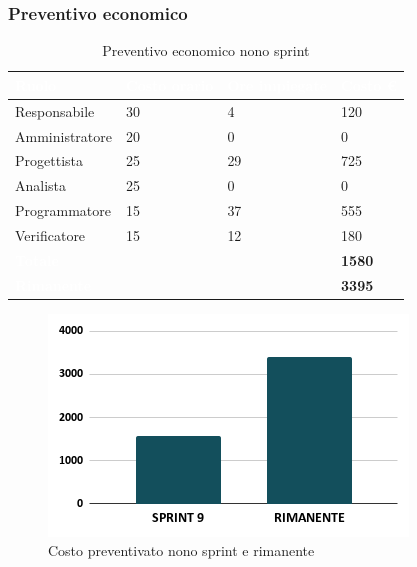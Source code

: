 \newpage

\subsubsection{Preventivo economico}

{
\setlength{\tabcolsep}{10pt}
\renewcommand{\arraystretch}{1.5}
\begin{table}[h]
    \centering
    \begin{tabularx}{\textwidth}{| l | l | l | X |}
        \hline
        \rowcolor{headerrow} \textbf{\textcolor{white}{Ruolo}} & \textbf{\textcolor{white}{Costo orario}} & \textbf{\textcolor{white}{Ore impiegate}} & \textbf{\textcolor{white}{Costo €}} \\
        \hline
        Responsabile & 30 & 4 & 120\\
        \hline
        Amministratore & 20 & 0 & 0\\
        \hline
        Progettista& 25 & 29 & 725\\
        \hline
        Analista & 25 & 0 & 0\\
        \hline
        Programmatore & 15 & 37 & 555\\
        \hline
        Verificatore & 15 & 12 & 180\\
        \hline
        \cellcolor{headerrow} \textbf{\textcolor{white}{Totale}} &  &  & \textbf{1580}\\
        \hline
        \cellcolor{headerrow} \textbf{\textcolor{white}{Rimanente}} &  &  & \textbf{3395}\\
        \hline
    \end{tabularx}
    \caption{Preventivo economico nono sprint}
    \label{tab:preventivocostinonosprint}
\end{table}
}

\begin{figure}[h!]
    \centering
    \includegraphics[width=\textwidth]{prev9costo.png}
    \caption{Costo preventivato nono sprint e rimanente}
    \label{fig:preventivocostononosprint}
\end{figure}

